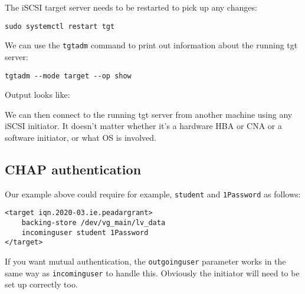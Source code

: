 \documentclass[slides]{pgnotes}
\begin{document}
The iSCSI target server needs to be restarted to pick up any changes:

\begin{verbatim}
sudo systemctl restart tgt
\end{verbatim}

We can use the \texttt{tgtadm} command to print out information about
the running tgt server:

\begin{verbatim}
tgtadm --mode target --op show
\end{verbatim}

Output looks like:

We can then connect to the running tgt server from another machine using
any iSCSI initiator. It doesn't matter whether it's a hardware HBA or
CNA or a software initiator, or what OS is involved.

\subsection{CHAP authentication}\label{chap-authentication}

Our example above could require for example, \texttt{student} and
\texttt{1Password} as follows:

\begin{verbatim}
<target iqn.2020-03.ie.peadargrant>
    backing-store /dev/vg_main/lv_data
    incominguser student 1Password
</target>
\end{verbatim}

If you want mutual authentication, the \texttt{outgoinguser} parameter
works in the same way as \texttt{incominguser} to handle this. Obviously
the initiator will need to be set up correctly too.
\end{document}
